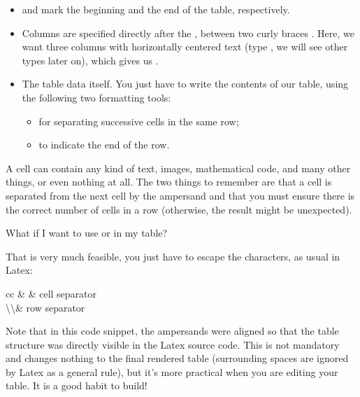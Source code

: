 \begin{itemize}
    \item {} and  mark the beginning and the end of the table, respectively.
    \item Columns are specified directly after the , between two curly braces \snippet{\{\}}. Here, we want three columns with horizontally centered text (type , we will see other types later on), which gives us .
    \item The table data itself. You just have to write the contents of our table, using the following two formatting tools:
    \begin{itemize}
        \item \snippet{\&} for separating successive cells in the same row;
        \item \snippet{\textbackslash\textbackslash} to indicate the end of the row.
    \end{itemize}
\end{itemize}

A cell can contain any kind of text, images, mathematical code, and many other things, or even nothing at all. The two things to remember are that a cell is separated from the next cell by the ampersand \snippet{\&} and that you must ensure there is the correct number of cells in a row (otherwise, the result might be unexpected).

\begin{questionbox}{}
What if I want to use \snippet{\&} or \snippet{\textbackslash\textbackslash} in my table?
\end{questionbox}

That is very much feasible, you just have to escape the characters, as usual in Latex:

\begin{Code}
\begin{tblr}{cc}
	\&                           & cell separator \\
	\textbackslash\textbackslash & row separator \\
\end{tblr}
\end{Code}

Note that in this code snippet, the ampersands were aligned so that the table structure was directly visible in the Latex source code. This is not mandatory and changes nothing to the final rendered table (surrounding spaces are ignored by Latex as a general rule), but it's more practical when you are editing your table. It is a good habit to build!

